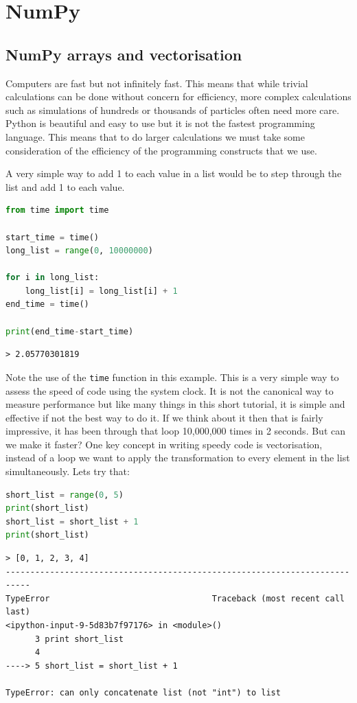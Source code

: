 \section{NumPy}
	\subsection{NumPy arrays and vectorisation}
	Computers are fast but not infinitely fast. This means that while trivial calculations can be done without concern for efficiency, more complex calculations such as simulations of hundreds or thousands of particles often need more care. Python is beautiful and easy to use but it is not the fastest programming language. This means that to do larger calculations we must take some consideration of the efficiency of the programming constructs that we use.

	A very simple way to add 1 to each value in a list would be to step through the list and add 1 to each value.
	\begin{lstlisting}[language=Python]
from time import time

start_time = time()
long_list = range(0, 10000000)

for i in long_list:
	long_list[i] = long_list[i] + 1
end_time = time()

print(end_time-start_time)\end{lstlisting}
	\begin{verbatim}> 2.05770301819\end{verbatim}

	Note the use of the \texttt{time} function in this example. This is a very simple way to assess the speed of code using the system clock. It is not the canonical way to measure performance but like many things in this short tutorial, it is simple and effective if not the best way to do it.
	If we think about it then that is fairly impressive, it has been through that loop 10,000,000 times in 2 seconds. But can we make it faster? One key concept in writing speedy code is vectorisation, instead of a loop we want to apply the transformation to every element in the list simultaneously. Lets try that:

	\begin{lstlisting}[language=Python]
short_list = range(0, 5)
print(short_list)
short_list = short_list + 1
print(short_list)\end{lstlisting}

	\begin{verbatim}
> [0, 1, 2, 3, 4]
---------------------------------------------------------------------------
TypeError                                 Traceback (most recent call last)
<ipython-input-9-5d83b7f97176> in <module>()
      3 print short_list
      4 
----> 5 short_list = short_list + 1

TypeError: can only concatenate list (not "int") to list\end{verbatim}

